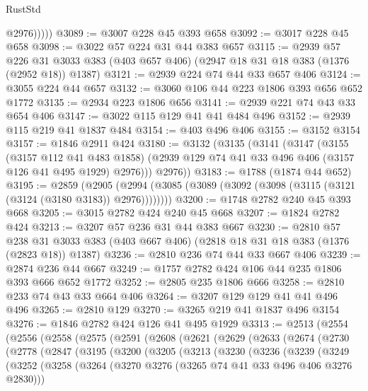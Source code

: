 \begin{lexlean}{RustStd}
\begin{coremodule}
              @2976)))))
@3089 := @3007 @228 @45 @393 @658
@3092 := @3017 @228 @45 @658
@3098 := @3022 @57 @224 @31 @44 @383 @657
@3115 := @2939
    @57
    @226
    @31
    @3033
    @383
    (@403 @657 @406)
    (@2947 @18 @31 @18 @383 (@1376 (@2952 @18)) @1387)
@3121 := @2939 @224 @74 @44 @33 @657 @406
@3124 := @3055 @224 @44 @657
@3132 := @3060 @106 @44 @223 @1806 @393 @656 @652 @1772
@3135 := @2934 @223 @1806 @656
@3141 := @2939 @221 @74 @43 @33 @654 @406
@3147 := @3022 @115 @129 @41 @41 @484 @496
@3152 := @2939 @115 @219 @41 @1837 @484
@3154 := @403 @496 @406
@3155 := @3152 @3154
@3157 := @1846 @2911 @424
@3180 := @3132
    (@3135
      (@3141
        (@3147
          (@3155
            (@3157 @112 @41 @483 @1858)
            (@2939 @129 @74 @41 @33 @496 @406 (@3157 @126 @41 @495 @1929) @2976)))
        @2976))
@3183 := @1788 (@1874 @44 @652)
@3195 := @2859
    (@2905 (@2994 (@3085 (@3089 (@3092 (@3098 (@3115 (@3121 (@3124 (@3180 @3183)) @2976))))))))
@3200 := @1748 @2782 @240 @45 @393 @668
@3205 := @3015 @2782 @424 @240 @45 @668
@3207 := @1824 @2782 @424
@3213 := @3207 @57 @236 @31 @44 @383 @667
@3230 := @2810
    @57
    @238
    @31
    @3033
    @383
    (@403 @667 @406)
    (@2818 @18 @31 @18 @383 (@1376 (@2823 @18)) @1387)
@3236 := @2810 @236 @74 @44 @33 @667 @406
@3239 := @2874 @236 @44 @667
@3249 := @1757 @2782 @424 @106 @44 @235 @1806 @393 @666 @652 @1772
@3252 := @2805 @235 @1806 @666
@3258 := @2810 @233 @74 @43 @33 @664 @406
@3264 := @3207 @129 @129 @41 @41 @496 @496
@3265 := @2810 @129
@3270 := @3265 @219 @41 @1837 @496 @3154
@3276 := @1846 @2782 @424 @126 @41 @495 @1929
@3313 := @2513
    (@2554
      (@2556
        (@2558
          (@2575
            (@2591
              (@2608
                (@2621
                  (@2629
                    (@2633
                      (@2674
                        (@2730
                          (@2778
                            (@2847
                              (@3195
                                (@3200
                                  (@3205
                                    (@3213
                                      (@3230
                                        (@3236
                                          (@3239
                                            (@3249
                                              (@3252
                                                (@3258
                                                  (@3264
                                                    (@3270
                                                      @3276
                                                      (@3265 @74 @41 @33 @496 @406 @3276 @2830)))

\end{coremodule}
\end{lexlean}
